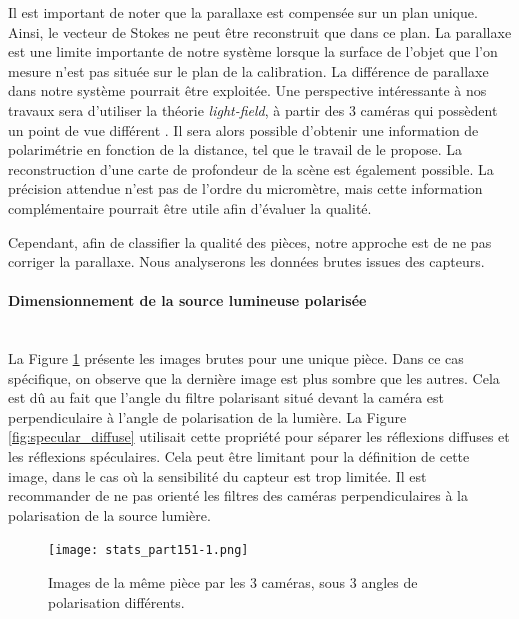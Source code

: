 Il est important de noter que la parallaxe est compensée sur un plan unique.
Ainsi, le vecteur de Stokes ne peut être reconstruit que dans ce plan.
La parallaxe est une limite importante de notre système lorsque la surface de l'objet que l'on mesure n'est pas située sur le plan de la calibration.
La différence de parallaxe dans notre système pourrait être exploitée.
Une perspective intéressante à nos travaux sera d'utiliser la théorie \textit{light-field}, à partir des 3 caméras qui possèdent un point de vue différent \cite{wilburn_high_2005}.
Il sera alors possible d'obtenir une information de polarimétrie en fonction de la distance, tel que le travail de \citeauthor{gendre_interest_2018} \cite{gendre_interest_2018} le propose.
La reconstruction d'une carte de profondeur de la scène est également possible.
La précision attendue n'est pas de l'ordre du micromètre, mais cette information complémentaire pourrait être utile afin d'évaluer la qualité.

Cependant, afin de classifier la qualité des pièces, notre approche est de ne pas corriger la parallaxe.
Nous analyserons les données brutes issues des capteurs.


\paragraph{Dimensionnement de la source lumineuse polarisée}\mbox{} \\
La Figure \ref{fig:raw_measures} présente les images brutes pour une unique pièce.
Dans ce cas spécifique, on observe que la dernière image est plus sombre que les autres.
Cela est dû au fait que l'angle du filtre polarisant situé devant la caméra est perpendiculaire à l'angle de polarisation de la lumière.
La Figure \ref{fig:specular_diffuse} utilisait cette propriété pour séparer les réflexions diffuses et les réflexions spéculaires.
Cela peut être limitant pour la définition de cette image, dans le cas où la sensibilité du capteur est trop limitée.
Il est recommander de ne pas orienté les filtres des caméras perpendiculaires à la polarisation de la source lumière.

\begin{figure}[htbp]
	\centering
	\texttt{[image: stats\_part151-1.png]}
	\caption{Images de la même pièce par les 3 caméras, sous 3 angles de polarisation différents.}
	\label{fig:raw_measures}
\end{figure}

